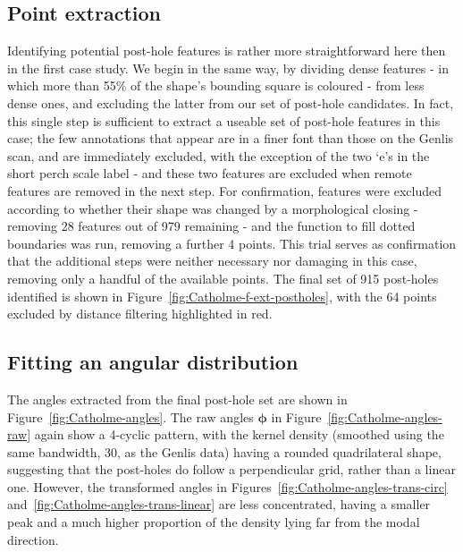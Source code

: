 \documentclass[../../ArchStats.tex]{subfiles}
\begin{document}
\subsection{Point extraction}
Identifying potential post-hole features is rather more straightforward here then in the first case study. We begin in the same way, by dividing dense features - in which more than 55\% of the shape's bounding square is coloured - from less dense ones, and excluding the latter from our set of post-hole candidates. In fact, this single step is sufficient to extract a useable set of post-hole features in this case; the few annotations that appear are in a finer font than those on the Genlis scan, and are immediately excluded, with the exception of the two `e's in the short perch scale label - and these two features are excluded when remote features are removed in the next step. For confirmation, features were excluded according to whether their shape was changed by a morphological closing - removing 28 features out of 979 remaining - and the function to fill dotted boundaries was run, removing a further 4 points. This trial serves as confirmation that the additional steps were neither necessary nor damaging in this case, removing only a handful of the available points. The final set of 915 post-holes identified is shown in Figure~\ref{fig:Catholme-f-ext-postholes}, with the 64 points excluded by distance filtering highlighted in red.






\subsection{Fitting an angular distribution}

The angles extracted from the final post-hole set are shown in Figure~\ref{fig:Catholme-angles}. The raw angles $\boldsymbol{\phi}$ in Figure~\ref{fig:Catholme-angles-raw} again show a 4-cyclic pattern, with the kernel density (smoothed using the same bandwidth, 30, as the Genlis data) having a rounded quadrilateral shape, suggesting that the post-holes do follow a perpendicular grid, rather than a linear one. However, the transformed angles in Figures~\ref{fig:Catholme-angles-trans-circ} and~\ref{fig:Catholme-angles-trans-linear} are less concentrated, having a smaller peak and a much higher proportion of the density lying far from the modal direction.
\end{document}
